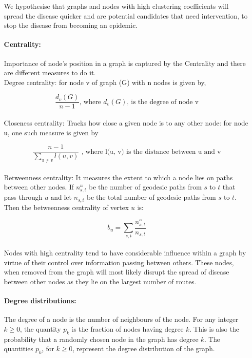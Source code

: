 \documentclass[a4paper,11pt]{article}
\begin{document}
We hypothesise that graphs and nodes with high clustering coefficients will spread the disease quicker and are potential candidates that need intervention, to stop the disease from becoming an epidemic.

\paragraph{Centrality:} Importance of node's position in a graph is captured by the Centrality and there are different measures to do it.
\\Degree centrality: for node v of graph (G) with n nodes is given by,


 \[ \frac{d_{v} (G) }{n - 1} \textrm{, where } d_{v}(G) \textrm{, is the degree of node v}\] \\
 

Closeness centrality: Tracks how close a given node is to any other node: for node u, one such measure is given by 

 \[ \frac{n-1 }{\sum_{u \neq v} l(u,v) }  \textrm{ , where l(u, v) is the distance between u and v}  \]  \\
 
 Betweenness centrality: It measures the extent to which a node lies on paths between other nodes. If $n_{s,t}^{u}$ be the number of geodesic paths from $s$ to $t$ that pass through $u$ and let $n_{s,t}$ be the total number of geodesic paths from $s$ to $t$. Then the betweenness centrality of vertex $u$ is:

\[\displaystyle{b_u =  \sum_{s, t} \frac{n_{s,t}^{u}}{n_{s,t}}}\] \\

Nodes with high centrality tend to have considerable influence within a graph by virtue of their control over information passing between others. These nodes, when removed from the graph will most likely disrupt the spread of disease between other nodes as they lie on the largest number of routes.

\paragraph{Degree distributions:} The degree of a node is the number of neighbours of the node. For any integer $k \geq 0$, the quantity $p_k$ is the fraction of nodes having degree $k$. This is also the probability that a randomly chosen node in the graph has degree $k$. The quantities $p_k$, for $k \geq 0$, represent the degree distribution of the graph. 
\end{document}
